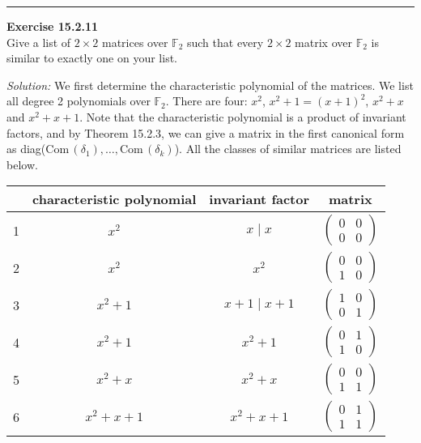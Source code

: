 \documentclass[a4paper, 12pt]{article}
\newenvironment{problem}[2][Exercise]
    { \begin{mdframed}[backgroundcolor=gray!20] \textbf{#1 #2} \\}
    {  \end{mdframed}}
\newenvironment{solution}
    {\textit{Solution:}}
    {}
\newcommand{\Com}{\text{Com}\,}
\begin{document}
\noindent\rule{7in}{2.8pt}
\begin{problem}{15.2.11}
Give a list of \(2\times 2\) matrices over \(\mathbb{F}_2\) such that every \(2\times 2\) matrix over \(\mathbb{F}_2\) is similar to exactly one on your list.
\end{problem}
\begin{solution}
We first determine the characteristic polynomial of the matrices. We list all degree 2 polynomials over \(\mathbb{F}_2\). There are four: \(x^2\), \(x^2+1=(x+1)^2\), \(x^2+x\) and \(x^2+x+1\). Note that the characteristic polynomial is a product of invariant factors, and by Theorem 15.2.3, 
we can give a matrix in the first canonical form as diag(\(\Com(\delta_1),\ldots,\Com(\delta_k)\)). All the classes of similar matrices are listed below. 
\begin{center}
\begin{tabular}{||c|c| c |c||} 
    \hline
	  & characteristic polynomial & invariant factor & matrix \\ [0.5ex] 
	\hline\hline
	1 & $x^2$ & $x\mid x$ & $\begin{pmatrix}
		0&0\\ 
		0&0
	\end{pmatrix}$ \\ [0.5ex]
	\hline
	2 & $x^2$ & $x^2$ &$\begin{pmatrix}
		0&0\\ 
		1&0
	\end{pmatrix}$  \\[0.5ex]
	\hline
	3 & $x^2+1$ & $x+1\mid x+1$ & $\begin{pmatrix}
		1&0\\ 
		0&1
	\end{pmatrix}$ \\[0.5ex]
	\hline
	4 & $x^2+1$ & $x^2+1$ & $\begin{pmatrix}
		0&1\\ 
		1&0
	\end{pmatrix}$ \\[0.5ex]
	\hline
	5 & $x^2+x$ & $x^2+x$ & $\begin{pmatrix}
		0&0\\ 
		1&1
	\end{pmatrix}$ \\ [0.5ex]
	\hline 
	6 & $x^2+x+1$ & $x^2+x+1$ & $\begin{pmatrix}
		0&1\\ 
		1&1
	\end{pmatrix}$ \\ [1ex] 
	\hline
   \end{tabular}
\end{center}
\end{solution}
\end{document}
